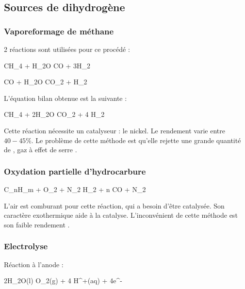 	\subsection{Sources de dihydrogène}
		\subsubsection{Vaporeformage de méthane}
		2 réactions sont utilisées pour ce procédé \cite{afhypac} :
		
		\begin{chemmath} 
			CH_4 + H_2O \longleftrightarrow CO + 3H_2
		\end{chemmath}
		
		\begin{chemmath}
			CO + H_2O \longleftrightarrow CO_2 + H_2
		\end{chemmath}
		
		L'équation bilan obtenue est la suivante :
		
		\begin{chemmath}
			CH_4 + 2H_2O \longleftrightarrow CO_2 + 4 H_2
		\end{chemmath}
		
			Cette réaction nécessite un catalyseur : le nickel. Le rendement varie
			entre $40-45\%$. Le problème de cette 
			méthode est qu'elle rejette une grande quantité de \chemform{CO_2}, 
			gaz à effet de serre \cite{wiki-h2}.
			
		\subsubsection{Oxydation partielle d'hydrocarbure}
		\begin{chemmath}
			C_nH_m +  O_2 +  N_2 \longrightarrow {} H_2 + n CO + \frac{3,76n}{2} N_2
		\end{chemmath}
		L'air est comburant pour cette réaction, qui a besoin d'être catalysée.
		Son caractère exothermique aide à la catalyse. 
		L'inconvénient de cette méthode est son faible rendement \cite{wiki-h2}.

		\subsubsection{Electrolyse}
		Réaction à l'anode : 
		
		\begin{chemmath}
			2H_2O(l) \longrightarrow O_2(g) + 4 H^+(aq) + 4e^-
		\end{chemmath}
		
